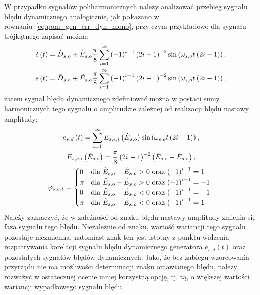 W przypadku sygnałów poliharmonicznych należy analizować przebieg sygnału błędu dynamicznego analogicznie, jak pokazano w równaniu~\eqref{eq:pom_gen_err_dyn_mono}, przy czym przykładowo dla sygnału trójkątnego zapisać można:
\begin{gather}
\dot{s} \left(t\right) = \dot{D}_{s,o} + \dot{E}_{s,o} \frac{\pi}{8} \sum _{i=1} ^{\infty} \left(-1\right)^{i-1} \left(2i - 1\right)^{-2} \sin \left(\omega_{s,o} t \left(2i - 1\right)\right) \label{eq:pom_gen_triangle_ideal}, \\
\tilde{s} \left(t\right) = \tilde{D}_{s,o} + \tilde{E}_{s,o} \frac{\pi}{8} \sum _{i=1} ^{\infty} \left(-1\right)^{i-1} \left(2i - 1\right)^{-2} \sin \left(\omega_{s,o} t \left(2i - 1\right)\right) \label{eq:pom_gen_triangle_real},
\end{gather}
zatem sygnał błędu dynamicznego zdefiniować można w postaci sumy harmonicznych tego sygnału o amplitudzie zależnej od realizacji błędu nastawy amplitudy:
\begin{gather}
e_{s,d} \emb{t} = \sum _{i=1} ^{\infty} E_{s,e,i} \emb{\dot{E}_{s,o}} \sin \emb{\omega_{s,o} t \emb{2i - 1}} \label{eq:pom_gen_err_dyn_triangle}, \\
E_{s,e,i} \emb{\dot{E}_{s,o}} = \frac{\pi}{8} \emb{2i - 1}^{-2} \emb{\tilde{E}_{s,o} - \dot{E}_{s,o}} \label{eq:pom_gen_err_amp_triangle}, \\
\varphi_{s,e,i} = 
\begin{cases}
0   & $dla $ \tilde{E}_{s,o} - \dot{E}_{s,o} > 0 $ oraz $ \emb{-1}^{i-1} =  1 \\
\pi & $dla $ \tilde{E}_{s,o} - \dot{E}_{s,o} > 0 $ oraz $ \emb{-1}^{i-1} = -1 \\
0   & $dla $ \tilde{E}_{s,o} - \dot{E}_{s,o} < 0 $ oraz $ \emb{-1}^{i-1} = -1 \\
\pi & $dla $ \tilde{E}_{s,o} - \dot{E}_{s,o} < 0 $ oraz $ \emb{-1}^{i-1} =  1
\end{cases}
\label{eq:pom_gen_err_phi_triangle}.
\end{gather}
Należy zaznaczyć, że w zależności od znaku błędu nastawy amplitudy zmienia się faza sygnału tego błędu. Niezależnie od znaku, wartość wariancji tego sygnału pozostaje niezmienna, natomiast znak ten jest istotny z punktu widzenia rozpatrywania korelacji sygnału błędu dynamicznego generatora $e_{s,d}(t)$ oraz pozostałych sygnałów błędów dynamicznych. Jako, że bez zabiegu wzorcowania przyrządu nie ma możliwości determinacji znaku omawianego błędu, należy rozważyć w ostatecznej ocenie mniej korzystną opcję, tj. tą, o większej wartości wariancji wypadkowego sygnału błędu.

